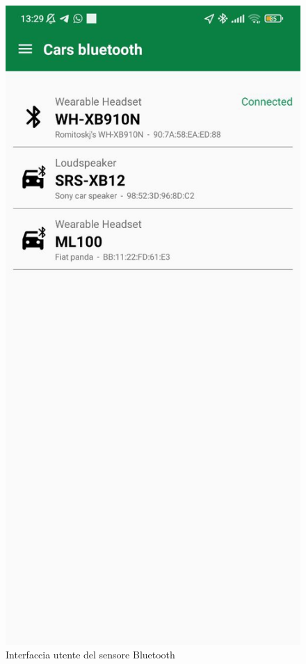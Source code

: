 \begin{figure}
    \centering
    \includegraphics[width=0.9\linewidth]{images/bluetooth_activity.jpg}
    \caption{Interfaccia utente del sensore Bluetooth}
    \label{fig:bluetooth_activity}
\end{figure}
